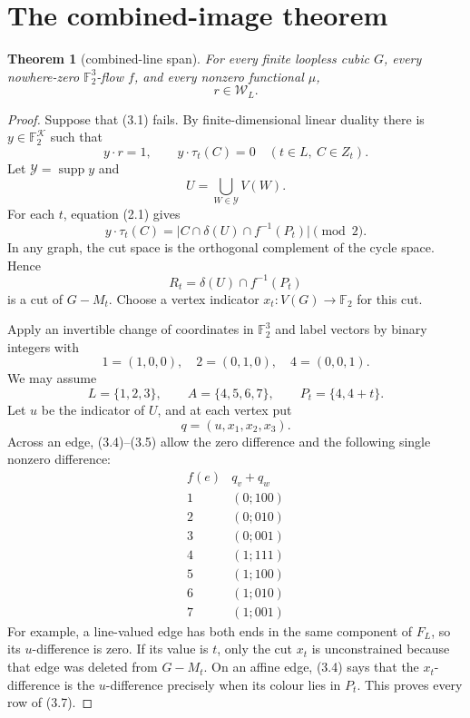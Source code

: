 \documentclass[11pt]{article}
\newtheorem{theorem}{Theorem}[section]
\theoremstyle{definition}
\theoremstyle{remark}
\newcommand{\F}{\mathbb F}
\newcommand{\Kcal}{\mathcal K}
\newcommand{\Wcal}{\mathcal W}
\newcommand{\supp}{\operatorname{supp}}
\begin{document}
\section{The combined-image theorem}
\label{sec:span}

\begin{theorem}[combined-line span]\label{thm:span}
For every finite loopless cubic \(G\), every nowhere-zero
\(\F_2^3\)-flow \(f\), and every nonzero functional \(\mu\),
\[
                              r\in\Wcal_L.
                                                        \tag{3.1}
\]
\end{theorem}

\begin{proof}
Suppose that (3.1) fails.  By finite-dimensional linear duality there
is \(y\in\F_2^{\Kcal}\) such that
\[
 y\cdot r=1,\qquad
 y\cdot\tau_t(C)=0
       \quad(t\in L,\ C\in Z_t).                        \tag{3.2}
\]
Let \(\mathcal Y=\supp y\) and
\[
                 U=\bigcup_{W\in\mathcal Y}V(W).
\]
For each \(t\), equation (2.1) gives
\[
 y\cdot\tau_t(C)
  =\bigl|C\cap\delta(U)\cap f^{-1}(P_t)\bigr|\pmod2.
                                                        \tag{3.3}
\]
In any graph, the cut space is the orthogonal complement of the cycle
space.  Hence
\[
 R_t=\delta(U)\cap f^{-1}(P_t)
                                                        \tag{3.4}
\]
is a cut of \(G-M_t\).  Choose a vertex indicator
\(x_t:V(G)\to\F_2\) for this cut.

Apply an invertible change of coordinates in \(\F_2^3\) and label
vectors by binary integers with
\[
 1=(1,0,0),\quad2=(0,1,0),\quad4=(0,0,1).
\]
We may assume
\[
 L=\{1,2,3\},\qquad A=\{4,5,6,7\},\qquad
 P_t=\{4,4+t\}.
                                                        \tag{3.5}
\]
Let \(u\) be the indicator of \(U\), and at each vertex put
\[
                         q=(u,x_1,x_2,x_3).
                                                        \tag{3.6}
\]
Across an edge, (3.4)--(3.5) allow the zero difference and the following
single nonzero difference:
\[
\begin{array}{c|c}
f(e)&q_v+q_w\\ \hline
1&(0;100)\\
2&(0;010)\\
3&(0;001)\\
4&(1;111)\\
5&(1;100)\\
6&(1;010)\\
7&(1;001)
\end{array}                                             \tag{3.7}
\]
For example, a line-valued edge has both ends in the same component of
\(F_L\), so its \(u\)-difference is zero.  If its value is \(t\), only
the cut \(x_t\) is unconstrained because that edge was deleted from
\(G-M_t\).  On an affine edge, (3.4) says that the \(x_t\)-difference
is the \(u\)-difference precisely when its colour lies in \(P_t\).
This proves every row of (3.7).


\end{proof}
\end{document}
